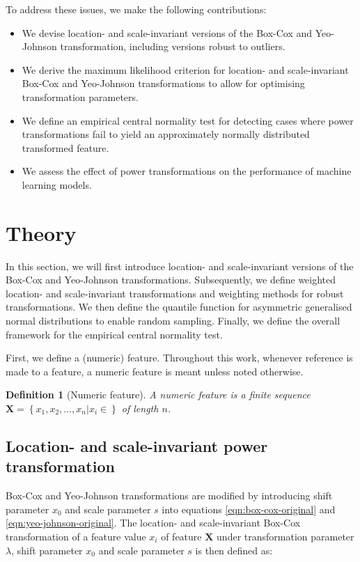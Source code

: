 \documentclass[
  a4paper,
]{article}
\newtheorem*{definition}{Definition}
\begin{document}
To address these issues, we make the following contributions:

\begin{itemize}
\item
  We devise location- and scale-invariant versions of the Box-Cox and
  Yeo-Johnson transformation, including versions robust to outliers.
\item
  We derive the maximum likelihood criterion for location- and
  scale-invariant Box-Cox and Yeo-Johnson transformations to allow for
  optimising transformation parameters.
\item
  We define an empirical central normality test for detecting cases
  where power transformations fail to yield an approximately normally
  distributed transformed feature.
\item
  We assess the effect of power transformations on the performance of
  machine learning models.
\end{itemize}

\section{Theory}\label{theory}

In this section, we will first introduce location- and scale-invariant
versions of the Box-Cox and Yeo-Johnson transformations. Subsequently,
we define weighted location- and scale-invariant transformations and
weighting methods for robust transformations. We then define the
quantile function for asymmetric generalised normal distributions to
enable random sampling. Finally, we define the overall framework for the
empirical central normality test.

First, we define a (numeric) feature. Throughout this work, whenever
reference is made to a feature, a numeric feature is meant unless noted
otherwise.

\begin{definition}[Numeric feature]
A numeric feature is a finite sequence $\mathbf{X} = \left\{x_1, x_2, \ldots, x_n | x_i \in  \right\}$ of length $n$.
\end{definition}

\subsection{Location- and scale-invariant power
transformation}\label{location--and-scale-invariant-power-transformation}

Box-Cox and Yeo-Johnson transformations are modified by introducing
shift parameter \(x_0\) and scale parameter \(s\) into equations
\ref{eqn:box-cox-original} and \ref{eqn:yeo-johnson-original}. The
location- and scale-invariant Box-Cox transformation of a feature value
\(x_i\) of feature \(\mathbf{X}\) under transformation parameter
\(\lambda\), shift parameter \(x_0\) and scale parameter \(s\) is then
defined as:
\end{document}
